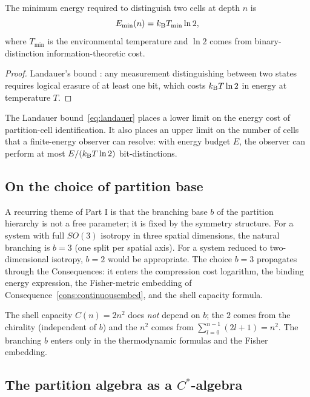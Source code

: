 \begin{corollary}
\label{cor:measurementenergy}
The minimum energy required to distinguish two cells at depth $n$ is
\begin{equation}
E_{\min}(n)=k_{\mathrm{B}} T_{\min}\ln 2,
\label{eq:landauer}
\end{equation}
where $T_{\min}$ is the environmental temperature and $\ln 2$ comes from binary-distinction information-theoretic cost.
\end{corollary}

\begin{proof}
Landauer's bound \citep{landauer1961}: any measurement distinguishing between two states requires logical erasure of at least one bit, which costs $k_{\mathrm{B}} T\ln 2$ in energy at temperature $T$.
\end{proof}

\begin{remark}
The Landauer bound~\eqref{eq:landauer} places a lower limit on the energy cost of partition-cell identification. It also places an upper limit on the number of cells that a finite-energy observer can resolve: with energy budget $E$, the observer can perform at most $E/(k_{\mathrm{B}} T\ln 2)$ bit-distinctions.
\end{remark}

\subsection{On the choice of partition base}

A recurring theme of Part I is that the branching base $b$ of the partition hierarchy is not a free parameter; it is fixed by the symmetry structure. For a system with full $SO(3)$ isotropy in three spatial dimensions, the natural branching is $b=3$ (one split per spatial axis). For a system reduced to two-dimensional isotropy, $b=2$ would be appropriate. The choice $b=3$ propagates through the Consequences: it enters the compression cost logarithm, the binding energy expression, the Fisher-metric embedding of Consequence~\ref{cons:continuousembed}, and the shell capacity formula.

The shell capacity $C(n)=2n^{2}$ does \emph{not} depend on $b$; the $2$ comes from the chirality (independent of $b$) and the $n^{2}$ comes from $\sum_{l=0}^{n-1}(2l+1)=n^{2}$. The branching $b$ enters only in the thermodynamic formulas and the Fisher embedding.

\subsection{The partition algebra as a $C^{*}$-algebra}

